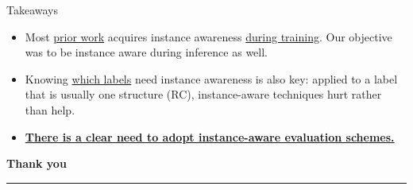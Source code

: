 \documentclass[aspectratio=169,11pt]{beamer}
\begin{document}
\begin{frame}{Takeaways}
\vspace{1em}
\begin{itemize}\setlength\itemsep{1.4em}
  \item Most \underline{prior work} acquires instance awareness \underline{during training}. Our objective was to be instance aware during inference as well.
  \item Knowing \underline{which labels} need instance awareness is also key: applied to a label that is usually one structure (RC), instance-aware techniques hurt rather than help.
  \item \textbf{\underline{There is a clear need to adopt instance-aware evaluation schemes.}}
\end{itemize}
\end{frame}

\begin{frame}[plain]
\vfill
\begin{center}
{\Huge\bfseries Thank you}\\[0.6em]
{\color{kclred}\rule{0.2\textwidth}{1.5pt}}
\end{center}
\vfill
\end{frame}
\end{document}
